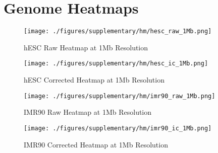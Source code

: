 \newpage
\section*{Genome Heatmaps}

\begin{figure}[thp]
  \begin{minipage}{0.5\textwidth}%
    \centering
    \texttt{[image: ./figures/supplementary/hm/hesc\_raw\_1Mb.png]}
    \caption{hESC Raw Heatmap at 1Mb Resolution}\label{fig:hm_hesc_raw}
  \end{minipage}
  \begin{minipage}{0.5\textwidth}
    \centering
    \texttt{[image: ./figures/supplementary/hm/hesc\_ic\_1Mb.png]}
    \caption{hESC Corrected Heatmap at 1Mb Resolution}\label{fig:hm_hesc_ic}
  \end{minipage}
\end{figure}

\begin{figure}[thp]
  \begin{minipage}{0.5\textwidth}%
    \centering
    \texttt{[image: ./figures/supplementary/hm/imr90\_raw\_1Mb.png]}
    \caption{IMR90 Raw Heatmap at 1Mb Resolution}\label{fig:hm_imr90_raw}
  \end{minipage}
  \begin{minipage}{0.5\textwidth}
    \centering
    \texttt{[image: ./figures/supplementary/hm/imr90\_ic\_1Mb.png]}
    \caption{IMR90 Corrected Heatmap at 1Mb Resolution}\label{fig:hm_imr90_ic}
  \end{minipage}
\end{figure}
